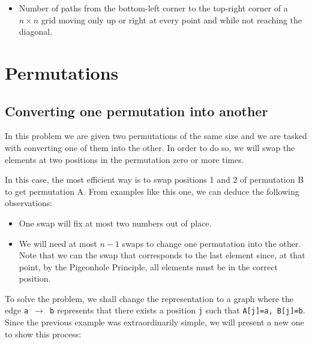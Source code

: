 \begin{itemize}
			\begin{figure}[h!]
					\centering
			\end{figure}

	\item Number of paths from the bottom-left corner to the top-right corner
			of a $n\times n$ grid moving only up or right at every point and
			while not reaching the diagonal.
			\begin{figure}[h!]
					\centering
			\end{figure}
			
\end{itemize}
\newpage
\section{Permutations}
\subsection{Converting one permutation into another }
In this problem we are given two permutations of the same size 
and we are tasked with converting one of them into the other. 
In order to do so, we will swap the elements at two positions
in the permutation zero or more times. 

\begin{figure}[h!]
\centering
{}

\end{figure}
In this case, the most efficient way is to swap positions 1 and 2 
of permutation B to get permutation A. From examples like this one, we can 
deduce the following observations:
\begin{itemize}
		\item One swap will fix at most two numbers out of
				place.
		\item We will need at most $n-1$ swaps to change one
				permutation into the other. Note that
				we can  the swap that corresponds
				to the last element since, at that point, by
				the Pigeonhole Principle, all elements must be in 
				the correct position.
\end{itemize}

To solve the problem, we shall change the representation 
to a graph where the edge \texttt{a \nolinebreak$\rightarrow$ \nolinebreak b} 
represents that there exists a position \texttt{j} such that 
\texttt{A[j]=a, B[j]=b}. Since the previous example was extraordinarily 
simple, we will present a new one to show this process:

